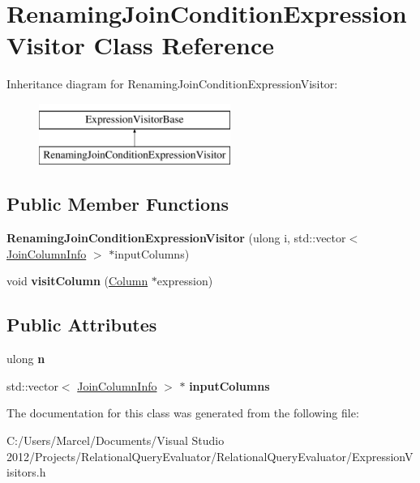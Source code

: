 \hypertarget{class_renaming_join_condition_expression_visitor}{\section{Renaming\+Join\+Condition\+Expression\+Visitor Class Reference}
\label{class_renaming_join_condition_expression_visitor}
}
Inheritance diagram for Renaming\+Join\+Condition\+Expression\+Visitor\+:\begin{figure}[H]
\begin{center}
\leavevmode
\includegraphics[height=2.000000cm]{class_renaming_join_condition_expression_visitor}
\end{center}
\end{figure}
\subsection*{Public Member Functions}
\begin{DoxyCompactItemize}
\item 
\hypertarget{class_renaming_join_condition_expression_visitor_a2b0669f3664fd3b9170e431bfcde9851}{{\bfseries Renaming\+Join\+Condition\+Expression\+Visitor} (ulong i, std\+::vector$<$ \hyperlink{class_join_column_info}{Join\+Column\+Info} $>$ $\ast$input\+Columns)}\label{class_renaming_join_condition_expression_visitor_a2b0669f3664fd3b9170e431bfcde9851}

\item 
\hypertarget{class_renaming_join_condition_expression_visitor_aa55184f591960115d4e11eff4be0d3d5}{void {\bfseries visit\+Column} (\hyperlink{class_column}{Column} $\ast$expression)}\label{class_renaming_join_condition_expression_visitor_aa55184f591960115d4e11eff4be0d3d5}

\end{DoxyCompactItemize}
\subsection*{Public Attributes}
\begin{DoxyCompactItemize}
\item 
\hypertarget{class_renaming_join_condition_expression_visitor_aa9eacf839bdb9a30653d5cae0448532b}{ulong {\bfseries n}}\label{class_renaming_join_condition_expression_visitor_aa9eacf839bdb9a30653d5cae0448532b}

\item 
\hypertarget{class_renaming_join_condition_expression_visitor_a8b8dceeedbf7c4d3aac3761ce3a4c302}{std\+::vector$<$ \hyperlink{class_join_column_info}{Join\+Column\+Info} $>$ $\ast$ {\bfseries input\+Columns}}\label{class_renaming_join_condition_expression_visitor_a8b8dceeedbf7c4d3aac3761ce3a4c302}

\end{DoxyCompactItemize}


The documentation for this class was generated from the following file\+:\begin{DoxyCompactItemize}
\item 
C\+:/\+Users/\+Marcel/\+Documents/\+Visual Studio 2012/\+Projects/\+Relational\+Query\+Evaluator/\+Relational\+Query\+Evaluator/Expression\+Visitors.\+h\end{DoxyCompactItemize}
